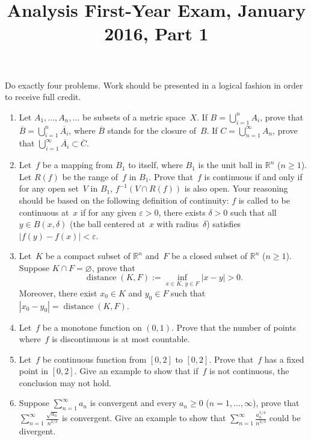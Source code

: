 \documentclass[11pt,letterpaper]{article}
\title{Analysis First-Year Exam, January 2016, Part 1}
\author{}
\date{}
\newenvironment{examproblems}[2]{%
  \def\ProblemHeadingTag{#2}%
  \AssignTaggingSocketPlug{block/list/label}{examproblem}%
  \begin{enumerate}%
  \setcounter{enumi}{#1}%
  \renewcommand{\labelenumi}{\textbf{\theenumi.}}%
  \setlength{\topsep}{0.35em}%
  \setlength{\partopsep}{0pt}%
  \setlength{\itemsep}{0.48em}%
  \setlength{\parsep}{0.18em}%
}{\end{enumerate}}
\newenvironment{examinstructions}{%
  \par\begingroup\itshape
}{%
  \par\endgroup\vspace{0.18em}
}
\begin{document}
\maketitle
\thispagestyle{empty}
\begin{examinstructions}
Do exactly four problems. Work should be presented in a logical fashion in order to receive full credit.
\end{examinstructions}
\begin{examproblems}{0}{H2}
\def\ProblemHeadingText{Problem 1.}
\item
Let \(A_1,\ldots,A_n,\ldots\) be subsets of a metric space~\(X\). If \(B=\bigcup_{i=1}^n A_i\), prove that \(\overline{B}=\bigcup_{i=1}^n \overline{A_i}\), where \(\overline{B}\) stands for the closure of~\(B\). If \(C=\bigcup_{n=1}^{\infty}A_n\), prove that \(\bigcup_{i=1}^{\infty}\overline{A_i}\subset\overline{C}\).
\def\ProblemHeadingText{Problem 2.}
\item
Let~\(f\) be a mapping from \(B_1\) to itself, where \(B_1\) is the unit ball in \(\mathbb{R}^n\) (\(n\geq 1\)). Let \(R(f)\) be the range of~\(f\) in \(B_1\). Prove that~\(f\) is continuous if and only if for any open set~\(V\) in \(B_1\), \(f^{-1}(V\cap R(f))\) is also open. Your reasoning should be based on the following definition of continuity: \(f\) is called to be continuous at~\(x\) if for any given \(\varepsilon>0\), there exists \(\delta>0\) such that all \(y\in B(x,\delta)\) (the ball centered at~\(x\) with radius~\(\delta\)) satisfies \(|f(y)-f(x)|<\varepsilon\).
\def\ProblemHeadingText{Problem 3.}
\item
Let~\(K\) be a compact subset of \(\mathbb{R}^n\) and~\(F\) be a closed subset of \(\mathbb{R}^n\) (\(n\geq 1\)). Suppose \(K\cap F=\varnothing\), prove that
\[
\operatorname{distance}(K,F):=\inf_{x\in K,\,y\in F}|x-y|>0.
\]
 Moreover, there exist \(x_0\in K\) and \(y_0\in F\) such that \(|x_0-y_0|=\operatorname{distance}(K,F)\).
\def\ProblemHeadingText{Problem 4.}
\item
Let~\(f\) be a monotone function on \((0,1)\). Prove that the number of points where~\(f\) is discontinuous is at most countable.
\def\ProblemHeadingText{Problem 5.}
\item
Let~\(f\) be continuous function from \([0,2]\) to \([0,2]\). Prove that~\(f\) has a fixed point in \([0,2]\). Give an example to show that if~\(f\) is not continuous, the conclusion may not hold.
\def\ProblemHeadingText{Problem 6.}
\item
Suppose \(\sum_{n=1}^{\infty}a_n\) is convergent and every \(a_n\geq 0\) (\(n=1,\ldots,\infty\)), prove that \(\sum_{n=1}^{\infty}\frac{\sqrt{a_n}}{n^{2/3}}\) is convergent. Give an example to show that \(\sum_{n=1}^{\infty}\frac{a_n^{1/4}}{n^{2/3}}\) could be divergent.
\end{examproblems}
\end{document}
